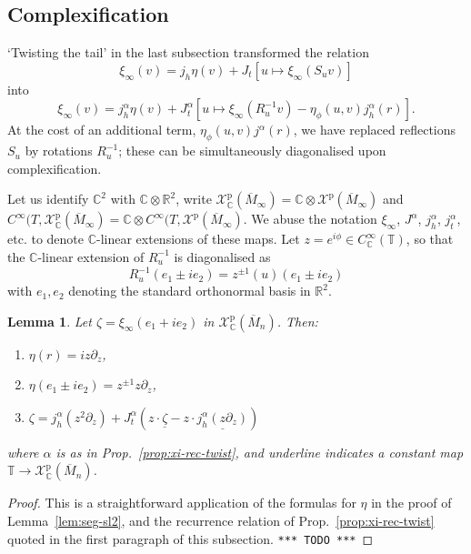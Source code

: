 \documentclass{article}
\def\MISS{\texttt{*** TODO ***}}
\def\RR{\mathbb{R}}
\def\CC{\mathbb{C}}
\def\TT{\mathbb{T}}
\def\XX{\mathscr{X}}
\def\p{\mathrm{p}}
\newtheorem{lem}{Lemma}
\theoremstyle{definition}
\begin{document}
\subsection{Complexification}
`Twisting the tail' in the last subsection
transformed the relation
$$ \xi_\infty(v) = j_h\eta(v) + J_t\left[ u \mapsto \xi_\infty(S_uv) \right] $$
into
$$ \xi_\infty(v) = j^\alpha_h\eta(v) + J_t^\alpha \left[ u \mapsto \xi_\infty(R_u^{-1}v) - 
\eta_\phi(u,v)j^\alpha_h(r) \right].
$$
At the cost of an additional term, $\eta_\phi(u,v)j^\alpha(r)$,
we have replaced reflections $S_u$ by rotations $R^{-1}_u$; these can be
simultaneously diagonalised upon complexification.

Let us identify $\CC^2$ with $\CC\otimes\RR^2$,
write $\XX_\CC^\p(\overline M_\infty) = \CC \otimes \XX^\p(\overline M_\infty)$
and $C^\infty(T, \XX_\CC^\p(\overline M_\infty) = \CC\otimes C^\infty(T, \XX^\p(\overline M_\infty)$.
We abuse the notation $\xi_\infty$, $J^\alpha$, $j_h^\alpha$, $j_t^\alpha$, etc.
to denote $\CC$-linear extensions of these maps.
Let
$z = e^{i\phi} \in C^\infty_\CC(\TT)$,
so that the $\CC$-linear extension of $R^{-1}_u$ is diagonalised as
$$
R^{-1}_u (e_1 \pm ie_2) = z^{\pm1}(u) (e_1\pm i e_2)
$$
with $e_1,e_2$ denoting the standard orthonormal basis in $\RR^2$.
\begin{lem}\label{lem:zeta}
Let $\zeta = \xi_\infty(e_1 + ie_2)$ in $\XX^\p_\CC(\overline M_n)$. Then:
\begin{enumerate}
\item
$\eta(r) = iz\partial_z$,
\item 
$\eta(e_1\pm ie_2) = z^{\pm 1} z\partial_z$,
\item
        $ \zeta = j^\alpha_h (z^2\partial_z) + J^\alpha_t \left( z  \cdot \underline{\zeta}
        -z  \cdot \underline{j^\alpha_h (z\partial_z)} \right)$
 \end{enumerate}
 where $\alpha$ is as in Prop.~\ref{prop:xi-rec-twist}, and
 underline indicates a constant map $\TT \to \XX^\p_\CC(\overline M_n)$.
\end{lem}
\begin{proof} This is a straightforward application 
        of the formulas for $\eta$
        in the proof of Lemma~\ref{lem:seg-sl2},
        and the recurrence relation of Prop.~\ref{prop:xi-rec-twist} quoted
        in the first paragraph of this subsection. \MISS
\end{proof}
\end{document}
